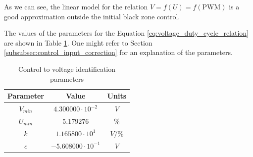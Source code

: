 As we can see, the linear model for the relation $V = f(U) = f(\text{PWM})$ is a good approximation outside the initial black zone control.

The values of the parameters for the Equation \ref{eq:voltage_duty_cycle_relation} are shown in Table \ref{tab:control_to_voltage_parameters}.
One might refer to Section \ref{subsubsec:control_input_correction} for an explanation of the parameters.

\begin{table}[H]

    \centering
    \begin{tabular}{|c|c|c|}
        \hline
        \textbf{Parameter} & \textbf{Value}            & \textbf{Units} \\
        \hline
        $V_{min}$          & $4.300000 \cdot 10^{-2}$  & $V$            \\
        $U_{min}$          & $5.179276$                & $\%$           \\
        $k$                & $1.165800 \cdot 10^{1}$   & $V/\%$         \\
        $c$                & $-5.608000 \cdot 10^{-1}$ & $V$            \\
        \hline
    \end{tabular}

    \caption{Control to voltage identification parameters}
    \label{tab:control_to_voltage_parameters}

\end{table}